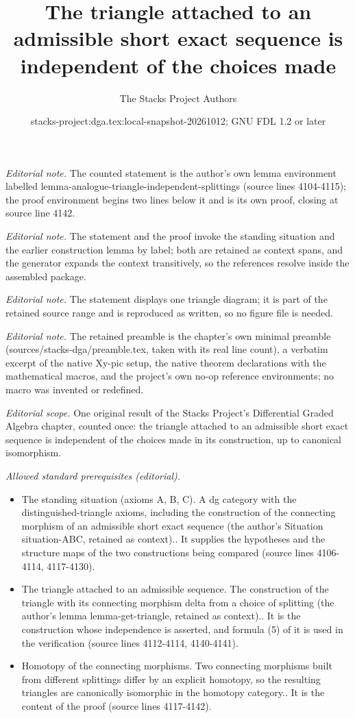 \documentclass{stacks-project}
\title{The triangle attached to an admissible short exact sequence is independent of the choices made}
\author{The Stacks Project Authors}
\date{stacks-project:dga.tex:local-snapshot-20261012; GNU FDL 1.2 or later}
\theoremstyle{plain}
\theoremstyle{definition}
\theoremstyle{remark}
\numberwithin{equation}{subsection}
\begin{document}
\maketitle
\noindent\textit{Editorial note.} The counted statement is the author's own lemma environment labelled lemma-analogue-triangle-independent-splittings (source lines 4104-4115); the proof environment begins two lines below it and is its own proof, closing at source line 4142.\par\medskip
\noindent\textit{Editorial note.} The statement and the proof invoke the standing situation and the earlier construction lemma by label; both are retained as context spans, and the generator expands the context transitively, so the references resolve inside the assembled package.\par\medskip
\noindent\textit{Editorial note.} The statement displays one triangle diagram; it is part of the retained source range and is reproduced as written, so no figure file is needed.\par\medskip
\noindent\textit{Editorial note.} The retained preamble is the chapter's own minimal preamble (sources/stacks-dga/preamble.tex, taken with its real line count), a verbatim excerpt of the native Xy-pic setup, the native theorem declarations with the mathematical macros, and the project's own no-op reference environments; no macro was invented or redefined.\par\medskip
\noindent\textit{Editorial scope.} One original result of the Stacks Project's Differential Graded Algebra chapter, counted once: the triangle attached to an admissible short exact sequence is independent of the choices made in its construction, up to canonical isomorphism.\par\medskip
\noindent\textit{Allowed standard prerequisites (editorial).}\begin{itemize}
\item The standing situation (axioms A, B, C). A dg category with the distinguished-triangle axioms, including the construction of the connecting morphism of an admissible short exact sequence (the author's Situation situation-ABC, retained as context).. It supplies the hypotheses and the structure maps of the two constructions being compared (source lines 4106-4114, 4117-4130).
\item The triangle attached to an admissible sequence. The construction of the triangle with its connecting morphism delta from a choice of splitting (the author's lemma lemma-get-triangle, retained as context).. It is the construction whose independence is asserted, and formula (5) of it is used in the verification (source lines 4112-4114, 4140-4141).
\item Homotopy of the connecting morphisms. Two connecting morphisms built from different splittings differ by an explicit homotopy, so the resulting triangles are canonically isomorphic in the homotopy category.. It is the content of the proof (source lines 4117-4142).
\end{itemize}\medskip
\end{document}
